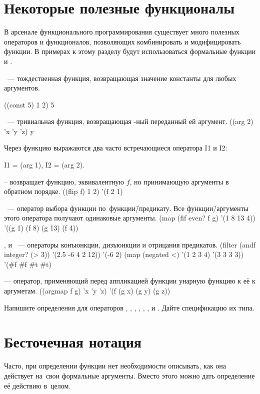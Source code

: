 \section{Некоторые полезные функционалы}\label{operators}%
В арсенале функционального программирования существует много полезных операторов и функционалов, позволяющих комбинировать и модифицировать функции. В примерах к этому разделу будут использоваться формальные функции  и .

\medskip
{}~--- тождественная функция, возвращающая значение константы  для любых аргументов.

\REPL
  {((const 5) 1 2)}
  {5}


\medskip
{}~--- тривиальная функция, возвращающая -ный переданный ей аргумент.
\REPL
  {((arg 2) 'x 'y 'z)}
  {y}

Через функцию  выражаются два часто встречающиеся оператора \si{I1} и \si{I2}:
\begin{SchemeCode}
  I1 = (arg 1),   I2 = (arg 2).
\end{SchemeCode}

\medskip
{} -- возвращает функцию, эквивалентную $f$, но принимающую аргументы в обратном порядке.
\REPL
  {((flip f) 1 2)}
  {'(f 2 1)}

\medskip
{}~--- оператор выбора функции по~функции\=/предикату. Все функции\=/аргументы этого оператора получают одинаковые аргументы.
\REPL
 {(map (fif even? f g) '(1 8 13 4))}
 {'((g 1) (f 8) (g 13) (f 4))}

\medskip
{},  и ~--- операторы конъюнкции, дизъюнкции и отрицания предикатов.
\REPL
  {(filter (andf integer? (> 3)) '(2.5 -6 4 2 12))}
  {'(-6 2)}
\REPL
  {(map (negated <) '(1 2 3 4) '(3 3 3 3))}
  {'(#f #f #t #t)}

\medskip
{} --- оператор, применяющий перед аппликацией функции  унарную функцию  к её к аргуметам.
\REPL
  {((argmap f g) 'x 'y 'z)}
  {'(f (g x) (g y) (g z))}

\begin{Assignment}
Напишите определения для операторов , , , , , ,  и . Дайте спецификацию их типа.
\end{Assignment}

\section[2]{Бесточечная нотация}\label{tacit}%
Часто, при определении функции нет необходимости описывать, как она действует на~свои формальные аргументы. Вместо этого можно дать определение её действию в~целом.

